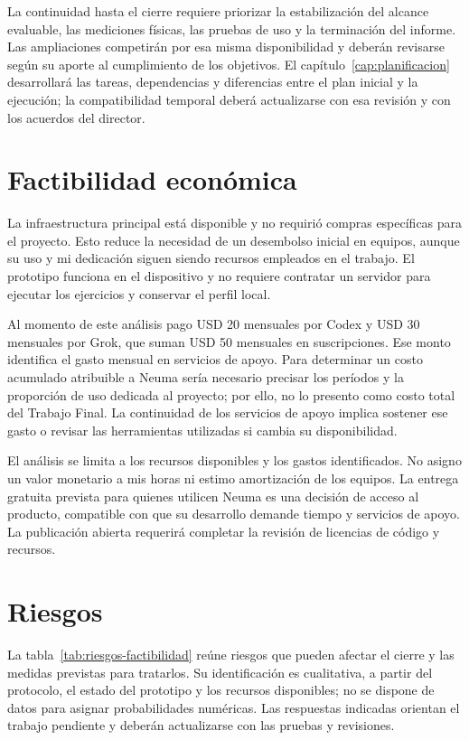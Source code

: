 La continuidad hasta el cierre requiere priorizar la estabilización del alcance
evaluable, las mediciones físicas, las pruebas de uso y la terminación del informe.
Las ampliaciones competirán por esa misma disponibilidad y deberán revisarse
según su aporte al cumplimiento de los objetivos. El capítulo~\ref{cap:planificacion}
desarrollará las tareas, dependencias y diferencias entre el plan inicial y la
ejecución; la compatibilidad temporal deberá actualizarse con esa revisión y
con los acuerdos del director.

\section{Factibilidad económica}
La infraestructura principal está disponible y no requirió compras específicas
para el proyecto. Esto reduce la necesidad de un desembolso inicial en equipos,
aunque su uso y mi dedicación siguen siendo recursos empleados en el trabajo.
El prototipo funciona en el dispositivo y no requiere contratar un servidor para
ejecutar los ejercicios y conservar el perfil local.

Al momento de este análisis pago USD 20 mensuales por Codex y USD 30 mensuales
por Grok, que suman USD 50 mensuales en suscripciones. Ese monto identifica el
gasto mensual en servicios de apoyo. Para determinar un costo acumulado atribuible
a Neuma sería necesario precisar los períodos y la proporción de uso dedicada
al proyecto; por ello, no lo presento como costo total del Trabajo Final. La
continuidad de los servicios de apoyo implica sostener ese gasto o revisar las
herramientas utilizadas si cambia su disponibilidad.

El análisis se limita a los recursos disponibles y los gastos identificados.
No asigno un valor monetario a mis horas ni estimo amortización de los equipos.
La entrega gratuita prevista para quienes utilicen Neuma es una decisión de
acceso al producto, compatible con que su desarrollo demande tiempo y servicios
de apoyo. La publicación abierta requerirá completar la revisión de licencias
de código y recursos.

\section{Riesgos}
La tabla~\ref{tab:riesgos-factibilidad} reúne riesgos que pueden afectar el
cierre y las medidas previstas para tratarlos. Su identificación es cualitativa,
a partir del protocolo, el estado del prototipo y los recursos disponibles;
no se dispone de datos para asignar probabilidades numéricas. Las respuestas
indicadas orientan el trabajo pendiente y deberán actualizarse con las pruebas
y revisiones.

